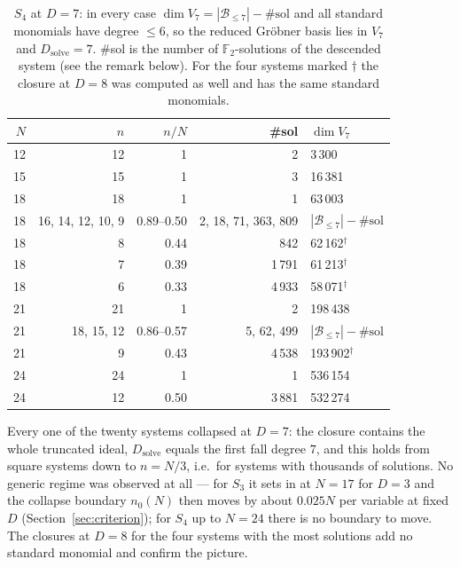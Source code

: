 \documentclass[11pt,a4paper]{article}
\theoremstyle{remark}\newtheorem{remark}{Remark}
\newcommand{\F}{\mathbb{F}}
\newcommand{\B}{\mathcal{B}}
\newcommand{\Dsolve}{D_{\mathrm{solve}}}
\begin{document}
\begin{table}[ht]\centering\small
\caption{$S_4$ at $D=7$: in every case $\dim V_7=|\B_{\le7}|-\#\text{sol}$ and all standard monomials have degree $\le6$, so the reduced Gröbner basis lies in $V_7$ and $\Dsolve=7$. \#sol is the number of $\F_2$-solutions of the descended system (see the remark below). For the four systems marked $\dagger$ the closure at $D=8$ was computed as well and has the same standard monomials.}\label{tab:s4}
\begin{tabular}{rrrrl}
\toprule
$N$ & $n$ & $n/N$ & \#sol & $\dim V_7$\\
\midrule
12 & 12 & 1 & 2 & 3\,300\\
15 & 15 & 1 & 3 & 16\,381\\
18 & 18 & 1 & 1 & 63\,003\\
18 & 16, 14, 12, 10, 9 & 0.89--0.50 & 2, 18, 71, 363, 809 & $|\B_{\le7}|-\#\text{sol}$\\
18 & 8 & 0.44 & 842 & 62\,162$^\dagger$\\
18 & 7 & 0.39 & 1\,791 & 61\,213$^\dagger$\\
18 & 6 & 0.33 & 4\,933 & 58\,071$^\dagger$\\
21 & 21 & 1 & 2 & 198\,438\\
21 & 18, 15, 12 & 0.86--0.57 & 5, 62, 499 & $|\B_{\le7}|-\#\text{sol}$\\
21 & 9 & 0.43 & 4\,538 & 193\,902$^\dagger$\\
24 & 24 & 1 & 1 & 536\,154\\
24 & 12 & 0.50 & 3\,881 & 532\,274\\
\bottomrule
\end{tabular}
\end{table}

Every one of the twenty systems collapsed at $D=7$: the closure contains the whole truncated ideal, $\Dsolve$ equals the first fall degree $7$, and this holds from square systems down to $n=N/3$, i.e.\ for systems with thousands of solutions. No generic regime was observed at all --- for $S_3$ it sets in at $N=17$ for $D=3$ and the collapse boundary $n_0(N)$ then moves by about $0.025N$ per variable at fixed $D$ (Section~\ref{sec:criterion}); for $S_4$ up to $N=24$ there is no boundary to move. The closures at $D=8$ for the four systems with the most solutions add no standard monomial and confirm the picture.
\end{document}

